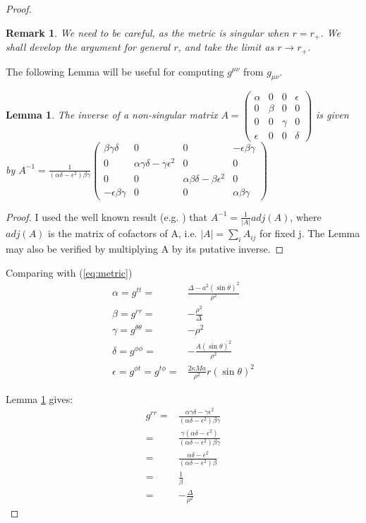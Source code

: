 \documentclass[]{article}
\newtheorem{lemma}[theorem]{Lemma}
\newtheorem{remark}[theorem]{Remark}
\begin{document}
\begin{proof}
\begin{remark}
	We need to be careful, as the metric is singular when $r=r_+$. We shall develop the argument for general $r$, and take the limit as $r\rightarrow r_+$.
\end{remark}
 The following Lemma will be useful for computing $g^{\mu\nu}$ from $g_{\mu\nu}$.
\begin{lemma}\label{lemma:inverse}
	The inverse of a non-singular matrix  
	$A=\begin{pmatrix}
		\alpha & 0 & 0 & \epsilon \\
		0 & \beta & 0 & 0 \\
		0 & 0 & \gamma & 0 \\
		\epsilon & 0 & 0 & \delta
	\end{pmatrix}$ is given by  $A^{-1}=\frac{1}{(\alpha\delta-\epsilon^2)\beta\gamma}\begin{pmatrix}
	\beta\gamma\delta & 0 & 0 & -\epsilon\beta\gamma\\
	0 & \alpha\gamma\delta - \gamma \epsilon^2 & 0 & 0\\
	0 & 0 & \alpha\beta\delta - \beta \epsilon^2 & 0 \\
	-\epsilon\beta\gamma & 0 & 0 & \alpha\beta\gamma
	\end{pmatrix}
	$
\end{lemma}

\begin{proof}
	I used the well known result (e.g. \cite[Theorem 5.2]{finkbeiner1960}) that $A^{-1} = \frac{1}{|A|} adj(A)$, where $adj(A)$ is the matrix of cofactors of A, i.e. $|A|=\sum_{i} A_{ij}$ for fixed j. The Lemma may also be verified by multiplying A by its putative inverse.
\end{proof}	

Comparing with (\ref{eq:metric})
\begin{align*}
\alpha =g^{tt}=& \frac{\Delta-a^2 (\sin{\theta})^2}{\rho^2}\\
\beta=g^{rr}=& - \frac{\rho^2}{\Delta} \\
\gamma =g^{\theta\theta}=& -\rho^2\\
\delta=g^{\phi\phi}=& - \frac{A (\sin{\theta})^2}{\rho^2} \\ 
\epsilon =g^{\phi t}=g^{t\phi}=&\frac{2 \kappa M a}{\rho^2} r (\sin{\theta})^2 
\end{align*}

Lemma \ref{lemma:inverse} gives:
\begin{align*}
g^{rr}=& \frac{ \alpha\gamma\delta - \gamma \epsilon^2}{(\alpha\delta-\epsilon^2)\beta\gamma}\\
=& \frac{ \gamma(\alpha\delta -  \epsilon^2)}{(\alpha\delta-\epsilon^2)\beta\gamma}\\
=& \frac{ \alpha\delta -  \epsilon^2}{(\alpha\delta-\epsilon^2)\beta}\\
=& \frac{1}{\beta}\\
=& -\frac{\Delta}{\rho^2}
\end{align*}


\end{proof}
\end{document}
